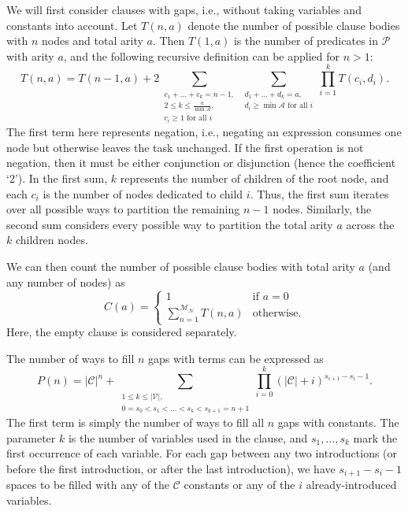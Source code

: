 \documentclass[runningheads]{llncs}
\newcommand{\predicates}{\mathcal{P}}
\newcommand{\variables}{\mathcal{V}}
\newcommand{\constants}{\mathcal{C}}
\newcommand{\arities}{\mathcal{A}}
\newcommand{\maxNumNodes}{\mathcal{M}_{\mathcal{N}}}
\begin{document}
We will first consider clauses with gaps, i.e., without taking variables and
constants into account. Let $T(n, a)$ denote the number of possible clause
bodies with $n$ nodes and total arity $a$. Then $T(1, a)$ is the number of
predicates in $\predicates{}$ with arity $a$, and the following recursive
definition can be applied for $n > 1$:
\[
  T(n, a) = T(n-1, a) + 2\sum_{\substack{c_1 + \dots + c_k = n - 1,\\
      2 \le k \le \frac{a}{\min \arities{}},\\
      c_i \ge 1 \text{ for all } i}} \sum_{\substack{d_1 + \dots + d_k = a,\\
    d_i \ge \min \arities{} \text{ for all } i}} \prod_{i=1}^k T(c_i, d_i).
\]
The first term here represents negation, i.e., negating an expression consumes
one node but otherwise leaves the task unchanged. If the first operation is not
negation, then it must be either conjunction or disjunction (hence the
coefficient `2'). In the first sum, $k$ represents the number of children of the
root node, and each $c_i$ is the number of nodes dedicated to child $i$. Thus,
the first sum iterates over all possible ways to partition the remaining $n-1$
nodes. Similarly, the second sum considers every possible way to partition the
total arity $a$ across the $k$ children nodes.

We can then count the number of possible clause bodies with total arity $a$ (and
any number of nodes) as
\[
  C(a) = \begin{cases}
    1 & \text{if } a = 0\\
    \sum_{n=1}^{\maxNumNodes{}} T(n, a) & \text{otherwise.}
  \end{cases}
\]
Here, the empty clause is considered separately.

The number of ways to fill $n$ gaps with terms can be expressed as
\[
  P(n) = |\constants{}|^n + \sum_{\substack{1 \le k \le |\variables{}|, \\ 0 =
      s_0 < s_1 < \dots < s_k < s_{k+1} = n+1}} \prod_{i=0}^k (|\constants{}| +
  i)^{s_{i+1} - s_i - 1}.
\]
The first term is simply the number of ways to fill all $n$ gaps with
constants. The parameter $k$ is the number of variables used in the clause, and
$s_1, \dots, s_k$ mark the first occurrence of each variable. For each gap
between any two introductions (or before the first introduction, or after the last
introduction), we have $s_{i+1}-s_i-1$ spaces to be filled with any of the
$\constants{}$ constants or any of the $i$ already-introduced variables.
\end{document}

